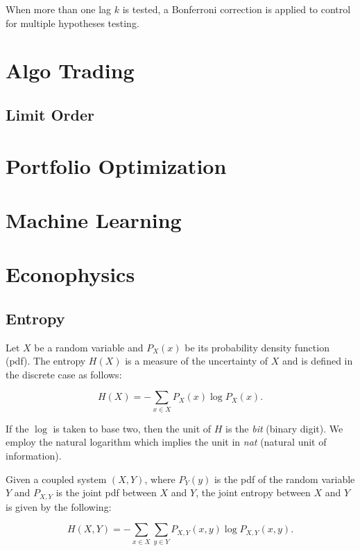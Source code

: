 \documentclass[]{book}
\theoremstyle{definition}
\theoremstyle{definition}
\theoremstyle{definition}
\theoremstyle{remark}
\begin{document}
When more than one lag \(k\) is tested, a Bonferroni correction is
applied to control for multiple hypotheses testing.

\part{Algo Trading}\label{part-algo-trading}

\chapter{Limit Order}\label{limit-order}

\part{Portfolio
Optimization}\label{part-portfolio-optimization}

\part{Machine Learning}\label{part-machine-learning}

\part{Econophysics}\label{part-econophysics}

\chapter{Entropy}\label{entropy}

Let \(X\) be a random variable and \(P_X(x)\) be its probability density
function (pdf). The entropy \(H(X)\) is a measure of the uncertainty of
\(X\) and is defined in the discrete case as follows:

\begin{equation}
H(X) = -\sum_{x \in X}{P_X(x)\log{P_X(x)}}.
\label{eq:H}
\end{equation}

If the \(\log\) is taken to base two, then the unit of \(H\) is the
\textit{bit} (binary digit). We employ the natural logarithm which
implies the unit in \textit{nat} (natural unit of information).

Given a coupled system \((X,Y)\), where \(P_Y(y)\) is the pdf of the
random variable \(Y\) and \(P_{X,Y}\) is the joint pdf between \(X\) and
\(Y\), the joint entropy between \(X\) and \(Y\) is given by the
following:

\begin{equation}
H(X,Y) = -\sum_{x \in X}{\sum_{y \in Y}{P_{X,Y}(x,y)\log{P_{X,Y}(x,y)}}}.
\label{eq:HXY}
\end{equation}
\end{document}
